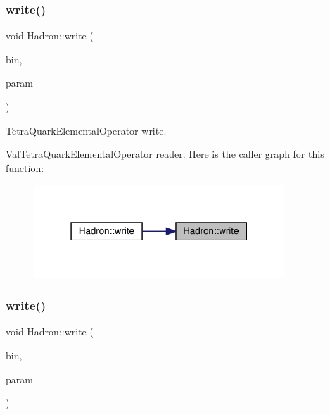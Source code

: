 \subsubsection{\texorpdfstring{write()}{write()}\hspace{0.1cm}{\footnotesize\ttfamily [54/95]}}
{\footnotesize\ttfamily void Hadron\+::write (\begin{DoxyParamCaption}\item[{\mbox{\hyperlink{classADATIO_1_1BinaryWriter}{Binary\+Writer}} \&}]{bin,  }\item[{const \mbox{\hyperlink{structHadron_1_1ValTetraQuarkElementalOperator__t}{Val\+Tetra\+Quark\+Elemental\+Operator\+\_\+t}} \&}]{param }\end{DoxyParamCaption})}



Tetra\+Quark\+Elemental\+Operator write. 

Val\+Tetra\+Quark\+Elemental\+Operator reader. Here is the caller graph for this function\+:
\nopagebreak
\begin{figure}[H]
\begin{center}
\leavevmode
\includegraphics[width=267pt]{d1/daf/namespaceHadron_ac78ff88ef705b3eaa48d7d440fe2a299_icgraph}
\end{center}
\end{figure}
\mbox{\label{namespaceHadron_a767bdf4c228c06edad1c47918ec75ed3}} 
\subsubsection{\texorpdfstring{write()}{write()}\hspace{0.1cm}{\footnotesize\ttfamily [55/95]}}
{\footnotesize\ttfamily void Hadron\+::write (\begin{DoxyParamCaption}\item[{\mbox{\hyperlink{classADATIO_1_1BinaryWriter}{Binary\+Writer}} \&}]{bin,  }\item[{const \mbox{\hyperlink{structHadron_1_1KeyHadronSUNNPartNPtCorr__t}{Key\+Hadron\+S\+U\+N\+N\+Part\+N\+Pt\+Corr\+\_\+t}} \&}]{param }\end{DoxyParamCaption})}



